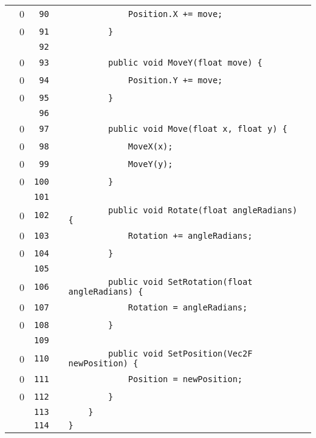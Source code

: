 \documentclass[a4paper,landscape,10pt]{article}
\begin{document}
\begin{longtable}[l]{lrrll}
\cellcolor{red} & 0 & \verb~90~ & & \verb~            Position.X += move;~\\
\cellcolor{red} & 0 & \verb~91~ & & \verb~        }~\\
\cellcolor{gray} &  & \verb~92~ & & \verb~~\\
\cellcolor{red} & 0 & \verb~93~ & & \verb~        public void MoveY(float move) {~\\
\cellcolor{red} & 0 & \verb~94~ & & \verb~            Position.Y += move;~\\
\cellcolor{red} & 0 & \verb~95~ & & \verb~        }~\\
\cellcolor{gray} &  & \verb~96~ & & \verb~~\\
\cellcolor{red} & 0 & \verb~97~ & & \verb~        public void Move(float x, float y) {~\\
\cellcolor{red} & 0 & \verb~98~ & & \verb~            MoveX(x);~\\
\cellcolor{red} & 0 & \verb~99~ & & \verb~            MoveY(y);~\\
\cellcolor{red} & 0 & \verb~100~ & & \verb~        }~\\
\cellcolor{gray} &  & \verb~101~ & & \verb~~\\
\cellcolor{red} & 0 & \verb~102~ & & \verb~        public void Rotate(float angleRadians) {~\\
\cellcolor{red} & 0 & \verb~103~ & & \verb~            Rotation += angleRadians;~\\
\cellcolor{red} & 0 & \verb~104~ & & \verb~        }~\\
\cellcolor{gray} &  & \verb~105~ & & \verb~~\\
\cellcolor{red} & 0 & \verb~106~ & & \verb~        public void SetRotation(float angleRadians) {~\\
\cellcolor{red} & 0 & \verb~107~ & & \verb~            Rotation = angleRadians;~\\
\cellcolor{red} & 0 & \verb~108~ & & \verb~        }~\\
\cellcolor{gray} &  & \verb~109~ & & \verb~~\\
\cellcolor{red} & 0 & \verb~110~ & & \verb~        public void SetPosition(Vec2F newPosition) {~\\
\cellcolor{red} & 0 & \verb~111~ & & \verb~            Position = newPosition;~\\
\cellcolor{red} & 0 & \verb~112~ & & \verb~        }~\\
\cellcolor{gray} &  & \verb~113~ & & \verb~    }~\\
\cellcolor{gray} &  & \verb~114~ & & \verb~}~\\
\end{longtable}
\newpage
\end{document}
